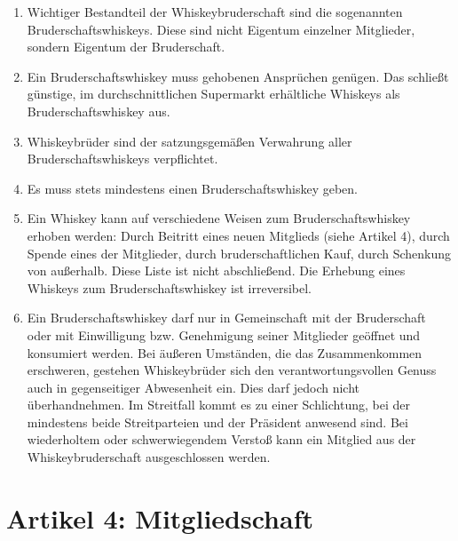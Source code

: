 \documentclass[a4paper,12pt]{article}
\begin{document}
\begin{enumerate}

\item Wichtiger Bestandteil der Whiskeybruderschaft sind die sogenannten Bruderschaftswhiskeys.
  Diese sind nicht Eigentum einzelner Mitglieder, sondern Eigentum der Bruderschaft.

\item Ein Bruderschaftswhiskey muss gehobenen Ansprüchen genügen. Das schließt günstige, im
  durchschnittlichen Supermarkt erhältliche Whiskeys als Bruderschaftswhiskey aus.

\item Whiskeybrüder sind der satzungsgemäßen Verwahrung aller Bruderschaftswhiskeys verpflichtet.

\item Es muss stets mindestens einen Bruderschaftswhiskey geben.

\item Ein Whiskey kann auf verschiedene Weisen zum Bruderschaftswhiskey erhoben werden: Durch
  Beitritt eines neuen Mitglieds (siehe Artikel 4), durch Spende eines der Mitglieder, durch
  bruderschaftlichen Kauf, durch Schenkung von außerhalb. Diese Liste ist nicht abschließend. Die
  Erhebung eines Whiskeys zum Bruderschaftswhiskey ist irreversibel.

\item Ein Bruderschaftswhiskey darf nur in Gemeinschaft mit der Bruderschaft oder mit Einwilligung
  bzw. Genehmigung seiner Mitglieder geöffnet und konsumiert werden. Bei äußeren Umständen, die das
  Zusammenkommen erschweren, gestehen Whiskeybrüder sich den verantwortungsvollen Genuss auch in
  gegenseitiger Abwesenheit ein. Dies darf jedoch nicht überhandnehmen. Im Streitfall kommt es zu
  einer Schlichtung, bei der mindestens beide Streitparteien und der Präsident anwesend sind. Bei
  wiederholtem oder schwerwiegendem Verstoß kann ein Mitglied aus der Whiskeybruderschaft
  ausgeschlossen werden.

\end{enumerate}



\section*{Artikel 4: Mitgliedschaft}
\end{document}

